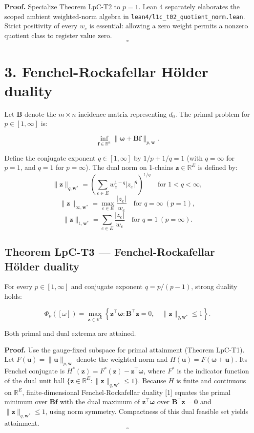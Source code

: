 \documentclass[
]{article}
\begin{document}
\textbf{Proof.} Specialize Theorem LpC-T2 to \(p = 1\). Lean 4 separately elaborates the scoped ambient weighted-norm algebra in \texttt{lean4/l1c\_t02\_quotient\_norm.lean}. Strict positivity of every \(w_e\)
is essential: allowing a zero weight permits a nonzero quotient class to register value zero. \[\square\]

\section{3. Fenchel-Rockafellar Hölder duality}\label{fenchel-rockafellar-huxf6lder-duality}

Let \(\mathbf{B}\) denote the \(m \times n\) incidence matrix representing \(d_0\). The primal problem for \(p \in [1, \infty]\) is:

\[\inf_{\mathbf{f} \in \mathbb{R}^n} \|\boldsymbol{\omega} + \mathbf{B}\mathbf{f}\|_{p, \mathbf{w}}.\]

Define the conjugate exponent \(q \in [1, \infty]\) by \(1/p + 1/q = 1\) (with \(q = \infty\) for \(p = 1\), and \(q = 1\) for \(p = \infty\)).
The dual norm on 1-chains \(\mathbf{z} \in \mathbb{R}^E\) is defined by:
\[\|\mathbf{z}\|_{q, \mathbf{w}^*} = \left( \sum_{e \in E} w_e^{1 - q} |z_e|^q \right)^{1/q} \quad \text{for } 1 < q < \infty,\]
\[\|\mathbf{z}\|_{\infty, \mathbf{w}^*} = \max_{e \in E} \frac{|z_e|}{w_e} \quad \text{for } q = \infty \ (p = 1),\]
\[\|\mathbf{z}\|_{1, \mathbf{w}^*} = \sum_{e \in E} \frac{|z_e|}{w_e} \quad \text{for } q = 1 \ (p = \infty).\]

\subsection{Theorem LpC-T3 --- Fenchel-Rockafellar Hölder duality}\label{theorem-lpc-t3-fenchel-rockafellar-huxf6lder-duality}

For every \(p \in [1, \infty]\) and conjugate exponent \(q = p/(p-1)\), strong duality holds:

\[\Phi_p([\omega]) = \max_{\mathbf{z} \in \mathbb{R}^E} \left\{ \mathbf{z}^\top \boldsymbol{\omega} : \mathbf{B}^\top \mathbf{z} = 0, \quad \|\mathbf{z}\|_{q, \mathbf{w}^*} \le 1 \right\}.\]

Both primal and dual extrema are attained.

\textbf{Proof.} Use the gauge-fixed subspace for primal attainment (Theorem LpC-T1). Let \(F(\mathbf{u}) = \|\mathbf{u}\|_{p,\mathbf{w}}\) denote the weighted norm and \(H(\mathbf{u}) = F(\boldsymbol{\omega} + \mathbf{u})\). Its Fenchel conjugate is \(H^*(\mathbf{z}) = F^*(\mathbf{z}) - \mathbf{z}^\top \boldsymbol{\omega}\), where \(F^*\) is the indicator function of the dual unit ball \(\{\mathbf{z} \in \mathbb{R}^E : \|\mathbf{z}\|_{q,\mathbf{w}^*} \le 1\}\). Because \(H\) is finite and continuous on \(\mathbb{R}^E\), finite-dimensional Fenchel-Rockafellar duality {[}1{]} equates the primal minimum over \(\mathbf{B}\mathbf{f}\) with the dual maximum of \(\mathbf{z}^\top \boldsymbol{\omega}\) over \(\mathbf{B}^\top \mathbf{z} = \mathbf{0}\) and \(\|\mathbf{z}\|_{q,\mathbf{w}^*} \le 1\), using norm symmetry. Compactness of this dual feasible set yields attainment. \[\square\]
\end{document}
